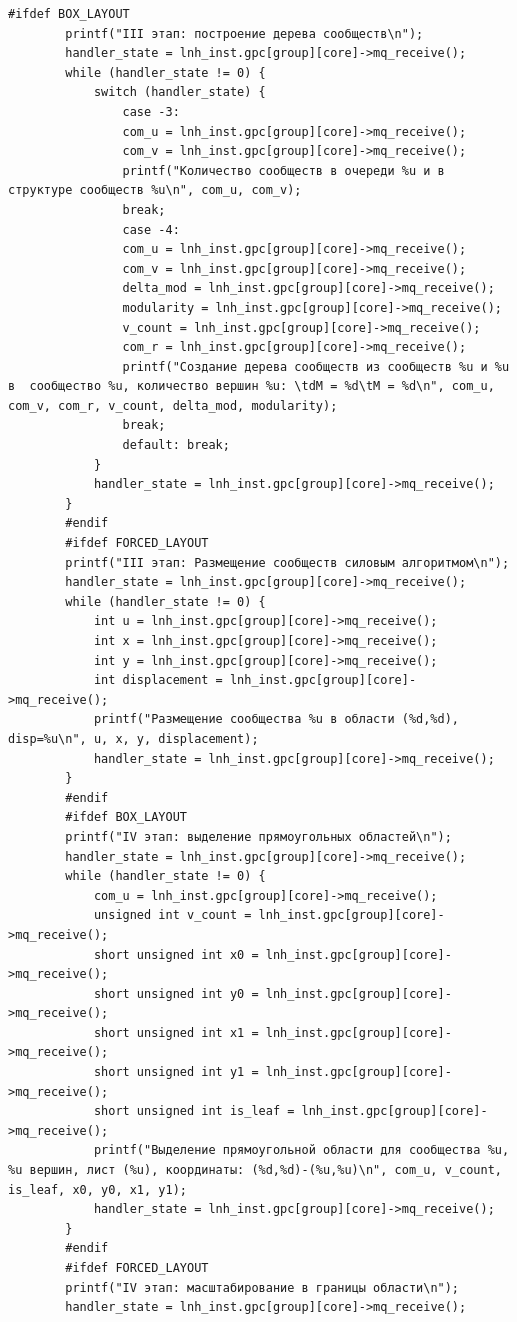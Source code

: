\begin{lstlisting}[label=lst:host,caption=Измененный код хост-системы под индивидульное задание]
		#ifdef BOX_LAYOUT
		printf("III этап: построение дерева сообществ\n");
		handler_state = lnh_inst.gpc[group][core]->mq_receive();
		while (handler_state != 0) {
			switch (handler_state) {
				case -3:
				com_u = lnh_inst.gpc[group][core]->mq_receive();
				com_v = lnh_inst.gpc[group][core]->mq_receive();
				printf("Количество сообществ в очереди %u и в структуре сообществ %u\n", com_u, com_v);
				break;
				case -4:
				com_u = lnh_inst.gpc[group][core]->mq_receive();
				com_v = lnh_inst.gpc[group][core]->mq_receive();
				delta_mod = lnh_inst.gpc[group][core]->mq_receive();
				modularity = lnh_inst.gpc[group][core]->mq_receive();
				v_count = lnh_inst.gpc[group][core]->mq_receive();
				com_r = lnh_inst.gpc[group][core]->mq_receive();
				printf("Создание дерева сообществ из сообществ %u и %u в  сообщество %u, количество вершин %u: \tdM = %d\tM = %d\n", com_u, com_v, com_r, v_count, delta_mod, modularity);
				break;
				default: break;
			}
			handler_state = lnh_inst.gpc[group][core]->mq_receive();
		}
		#endif
		#ifdef FORCED_LAYOUT
		printf("III этап: Размещение сообществ силовым алгоритмом\n");
		handler_state = lnh_inst.gpc[group][core]->mq_receive();
		while (handler_state != 0) {
			int u = lnh_inst.gpc[group][core]->mq_receive();
			int x = lnh_inst.gpc[group][core]->mq_receive();
			int y = lnh_inst.gpc[group][core]->mq_receive();
			int displacement = lnh_inst.gpc[group][core]->mq_receive();
			printf("Размещение сообщества %u в области (%d,%d), disp=%u\n", u, x, y, displacement);
			handler_state = lnh_inst.gpc[group][core]->mq_receive();
		}
		#endif
		#ifdef BOX_LAYOUT
		printf("IV этап: выделение прямоугольных областей\n");
		handler_state = lnh_inst.gpc[group][core]->mq_receive();
		while (handler_state != 0) {
			com_u = lnh_inst.gpc[group][core]->mq_receive();
			unsigned int v_count = lnh_inst.gpc[group][core]->mq_receive();
			short unsigned int x0 = lnh_inst.gpc[group][core]->mq_receive();
			short unsigned int y0 = lnh_inst.gpc[group][core]->mq_receive();
			short unsigned int x1 = lnh_inst.gpc[group][core]->mq_receive();
			short unsigned int y1 = lnh_inst.gpc[group][core]->mq_receive();
			short unsigned int is_leaf = lnh_inst.gpc[group][core]->mq_receive();
			printf("Выделение прямоугольной области для сообщества %u, %u вершин, лист (%u), координаты: (%d,%d)-(%u,%u)\n", com_u, v_count, is_leaf, x0, y0, x1, y1);
			handler_state = lnh_inst.gpc[group][core]->mq_receive();
		}
		#endif
		#ifdef FORCED_LAYOUT
		printf("IV этап: масштабирование в границы области\n");
		handler_state = lnh_inst.gpc[group][core]->mq_receive();

\end{lstlisting}
